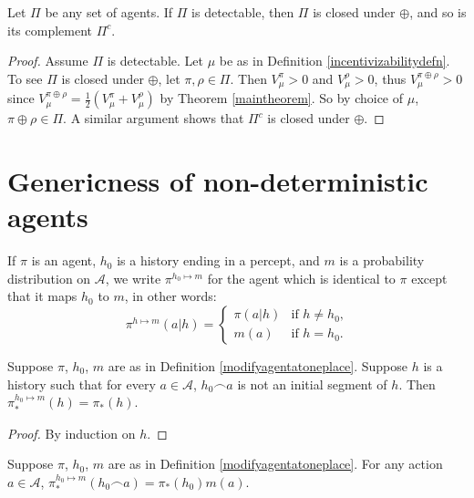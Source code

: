 \documentclass[runningheads]{llncs}
\begin{document}
\begin{theorem}
\label{closuretheorem}
    Let $\Pi$ be any set of agents.
    If $\Pi$ is detectable, then $\Pi$ is closed under $\oplus$, and so
    is its complement $\Pi^c$.
\end{theorem}

\begin{proof}
    Assume $\Pi$ is detectable.
    Let $\mu$ be as in
    Definition \ref{incentivizabilitydefn}.
    To see $\Pi$ is closed under $\oplus$, let $\pi,\rho\in\Pi$.
    Then $V^\pi_\mu>0$ and $V^\rho_\mu>0$, thus
    $V^{\pi\oplus\rho}_\mu>0$ since
    $V^{\pi\oplus\rho}_\mu=\frac12(V^\pi_\mu+V^\rho_\mu)$ by Theorem
    \ref{maintheorem}.
    So by choice of $\mu$, $\pi\oplus\rho\in \Pi$.
    A similar argument shows that $\Pi^c$ is closed under $\oplus$.
\end{proof}


\section{Genericness of non-deterministic agents}

\begin{definition}
\label{modifyagentatoneplace}
    If $\pi$ is an agent, $h_0$ is a history ending in a percept,
    and $m$ is a probability distribution on $\mathcal A$,
    we write $\pi^{h_0\mapsto m}$ for the agent which is identical to $\pi$
    except that it maps $h_0$ to $m$, in other words:
    \[
        \pi^{h\mapsto m}(a|h)
        =
        \begin{cases}
            \pi(a|h) &\mbox{if $h\not=h_0$,}\\
            m(a) &\mbox{if $h=h_0$.}
        \end{cases}
    \]
\end{definition}

\begin{lemma}
\label{firsttechlemmaforgenericity}
    Suppose $\pi$, $h_0$, $m$ are as in Definition \ref{modifyagentatoneplace}.
    Suppose $h$ is a history such that
    for every $a\in\mathcal A$,
    $h_0\frown a$ is not an initial segment of $h$.
    Then $\pi^{h_0\mapsto m}_*(h)=\pi_*(h)$.
\end{lemma}

\begin{proof}
    By induction on $h$.
\end{proof}

\begin{lemma}
\label{thirdtechlemmaforgenericity}
    Suppose $\pi$, $h_0$, $m$ are as in Definition \ref{modifyagentatoneplace}.
    For any action $a\in\mathcal A$,
    $\pi^{h_0\mapsto m}_*(h_0\frown a)=\pi_*(h_0)m(a)$.
\end{lemma}
\end{document}
